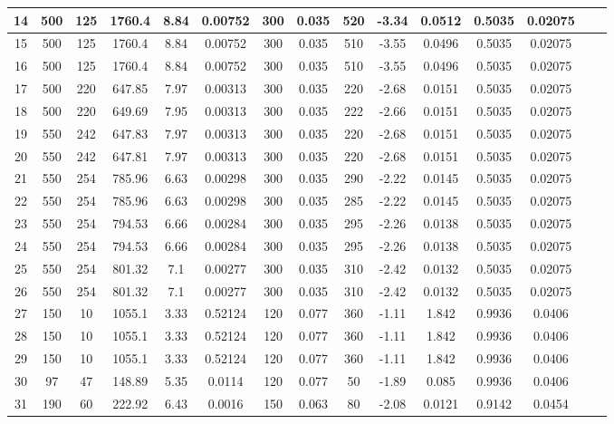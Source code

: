 \begin{table} [tb]
{\begin{tabular}{|c|c|c|c|c|c|c|c|c|c|c|c|c|c|c|}
    \hline
14	&	500	&	125	&	1760.4	&	8.84	&	0.00752	&	300	&	0.035	&	520	&	-3.34	&	0.0512	&	0.5035	&	0.02075\\
    \hline
15	&	500	&	125	&	1760.4	&	8.84	&	0.00752	&	300	&	0.035	&	510	&	-3.55	&	0.0496	&	0.5035	&	0.02075\\
    \hline
16	&	500	&	125	&	1760.4	&	8.84	&	0.00752	&	300	&	0.035	&	510	&	-3.55	&	0.0496	&	0.5035	&	0.02075\\
    \hline
17	&	500	&	220	&	647.85	&	7.97	&	0.00313	&	300	&	0.035	&	220	&	-2.68	&	0.0151	&	0.5035	&	0.02075\\
    \hline
18	&	500	&	220	&	649.69	&	7.95	&	0.00313	&	300	&	0.035	&	222	&	-2.66	&	0.0151	&	0.5035	&	0.02075\\
    \hline
19	&	550	&	242	&	647.83	&	7.97	&	0.00313	&	300	&	0.035	&	220	&	-2.68	&	0.0151	&	0.5035	&	0.02075\\
    \hline
20	&	550	&	242	&	647.81	&	7.97	&	0.00313	&	300	&	0.035	&	220	&	-2.68	&	0.0151	&	0.5035	&	0.02075\\
    \hline
21	&	550	&	254	&	785.96	&	6.63	&	0.00298	&	300	&	0.035	&	290	&	-2.22	&	0.0145	&	0.5035	&	0.02075\\
    \hline
22	&	550	&	254	&	785.96	&	6.63	&	0.00298	&	300	&	0.035	&	285	&	-2.22	&	0.0145	&	0.5035	&	0.02075\\
    \hline
23	&	550	&	254	&	794.53	&	6.66	&	0.00284	&	300	&	0.035	&	295	&	-2.26	&	0.0138	&	0.5035	&	0.02075\\
    \hline
24	&	550	&	254	&	794.53	&	6.66	&	0.00284	&	300	&	0.035	&	295	&	-2.26	&	0.0138	&	0.5035	&	0.02075\\
    \hline
25	&	550	&	254	&	801.32	&	7.1	&	0.00277	&	300	&	0.035	&	310	&	-2.42	&	0.0132	&	0.5035	&	0.02075\\
    \hline
26	&	550	&	254	&	801.32	&	7.1	&	0.00277	&	300	&	0.035	&	310	&	-2.42	&	0.0132	&	0.5035	&	0.02075\\
    \hline
27	&	150	&	10	&	1055.1	&	3.33	&	0.52124	&	120	&	0.077	&	360	&	-1.11	&	1.842	&	0.9936	&	0.0406\\
    \hline
28	&	150	&	10	&	1055.1	&	3.33	&	0.52124	&	120	&	0.077	&	360	&	-1.11	&	1.842	&	0.9936	&	0.0406\\
    \hline
29	&	150	&	10	&	1055.1	&	3.33	&	0.52124	&	120	&	0.077	&	360	&	-1.11	&	1.842	&	0.9936	&	0.0406\\
    \hline
30	&	97	&	47	&	148.89	&	5.35	&	0.0114	&	120	&	0.077	&	50	&	-1.89	&	0.085	&	0.9936	&	0.0406\\
    \hline
31	&	190	&	60	&	222.92	&	6.43	&	0.0016	&	150	&	0.063	&	80	&	-2.08	&	0.0121	&	0.9142	&	0.0454\\

\end{tabular}}
\end{table}
